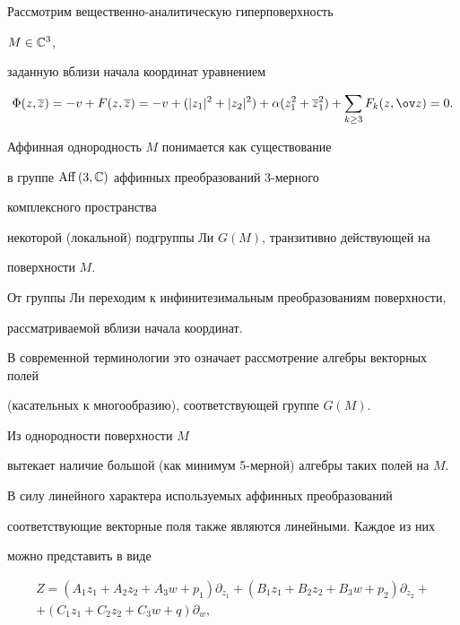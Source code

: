 Рассмотрим вещественно-аналитическую гиперповерхность 


$ M \in \Bbb C^3 $,


заданную вблизи начала координат уравнением 


$$


 \Phi(z,\overline z ) = - v + F(z, \overline z) = 


 - v + ( | z_1 |^2 + |z_2 |^2 ) + \alpha (z_1^2 + \overline z_1^2 ) +


 \sum_{k \ge 3} F_k(z, \ov z) = 0.


$$


Аффинная однородность $ M $ понимается как существование


в группе $\mathrm{Aff}\,(3, \Bbb C ) $ аффинных преобразований 3-мерного 


комплексного пространства


некоторой (локальной) подгруппы Ли $ G(M) $, транзитивно действующей на 


поверхности $ M $.








От группы Ли переходим к инфинитезимальным преобразованиям поверхности,


рассматриваемой вблизи начала координат.


В современной терминологии это означает рассмотрение алгебры векторных полей 


(касательных к многообразию), соответствующей группе $ G(M) $. 


Из однородности поверхности $ M $ 


вытекает наличие большой (как минимум 5-мерной) алгебры таких полей на $ M $.





В силу линейного характера используемых аффинных преобразований 


соответствующие векторные поля также являются линейными. Каждое из них 


можно представить в виде


\begin{multline}


Z = ( A_1 z_1 +  A_2 z_2 + A_3 w + p_1 )


{\partial}_{z_1} + ( B_1 z_1 + 


 B_2 z_2 + B_3 w + p_2 ){\partial}_{z_2} +


\\


+( C_1 z_1 +  C_2 z_2 + C_3 w + q ){\partial}_{w},


\end{multline}


